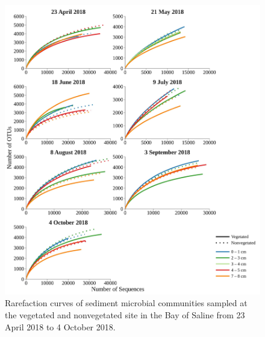 \documentclass[12pt,]{article}
\begin{document}
\begin{figure}[H]

{\centering \includegraphics[width=0.85\linewidth,height=0.8\textheight]{../results/figures/rarefaction_b} 

}

\caption{Rarefaction curves of sediment microbial communities sampled at the vegetated and nonvegetated site in the Bay of Saline from 23 April 2018 to 4 October 2018.\label{rarefaction_b}}\label{fig:unnamed-chunk-2}
\end{figure}
\end{document}
